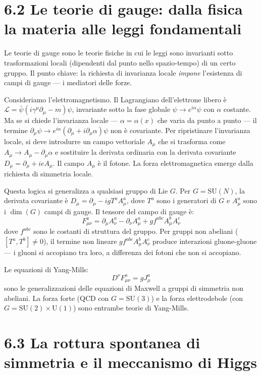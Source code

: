 \documentclass[11.5pt,a4paper,openany]{book}
\theoremstyle{remark}
\begin{document}
\section{6.2 Le teorie di gauge: dalla fisica la materia alle leggi fondamentali}

Le teorie di gauge sono le teorie fisiche in cui le leggi sono invarianti sotto trasformazioni locali (dipendenti dal punto nello spazio-tempo) di un certo gruppo. Il punto chiave: la richiesta di invarianza locale \textit{impone} l'esistenza di campi di gauge --- i mediatori delle forze.

Consideriamo l'elettromagnetismo. Il Lagrangiano dell'elettrone libero è $\mathcal{L} = \bar{\psi}(i\gamma^\mu\partial_\mu - m)\psi$, invariante sotto la fase globale $\psi \to e^{i\alpha}\psi$ con $\alpha$ costante. Ma se si chiede l'invarianza locale --- $\alpha = \alpha(x)$ che varia da punto a punto --- il termine $\partial_\mu\psi \to e^{i\alpha}(\partial_\mu + i\partial_\mu\alpha)\psi$ non è covariante. Per ripristinare l'invarianza locale, si deve introdurre un campo vettoriale $A_\mu$ che si trasforma come $A_\mu \to A_\mu - \partial_\mu\alpha$ e sostituire la derivata ordinaria con la derivata covariante $D_\mu = \partial_\mu + ieA_\mu$. Il campo $A_\mu$ è il fotone. La forza elettromagnetica emerge dalla richiesta di simmetria locale.

Questa logica si generalizza a qualsiasi gruppo di Lie $G$. Per $G = \mathrm{SU}(N)$, la derivata covariante è $D_\mu = \partial_\mu - igT^a A^a_\mu$, dove $T^a$ sono i generatori di $G$ e $A^a_\mu$ sono i $\dim(G)$ campi di gauge. Il tensore del campo di gauge è:
\[
F^a_{\mu\nu} = \partial_\mu A^a_\nu - \partial_\nu A^a_\mu + gf^{abc}A^b_\mu A^c_\nu
\]
dove $f^{abc}$ sono le costanti di struttura del gruppo. Per gruppi non abeliani ($[T^a, T^b] \neq 0$), il termine non lineare $gf^{abc}A^b_\mu A^c_\nu$ produce interazioni gluone-gluone --- i gluoni si accopiano tra loro, a differenza dei fotoni che non si accopiano.

Le equazioni di Yang-Mills:
\[
D^\nu F^a_{\mu\nu} = g J^a_\mu
\]
sono le generalizzazioni delle equazioni di Maxwell a gruppi di simmetria non abeliani. La forza forte (QCD con $G = \mathrm{SU}(3)$) e la forza elettrodebole (con $G = \mathrm{SU}(2) \times \mathrm{U}(1)$) sono entrambe teorie di Yang-Mills.

\section{6.3 La rottura spontanea di simmetria e il meccanismo di Higgs}
\end{document}
